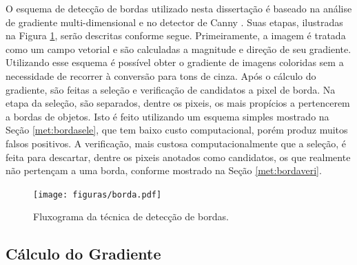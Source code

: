 O esquema de detecção de bordas utilizado nesta dissertação é baseado na análise de gradiente multi-dimensional \cite{borda00} e no detector de Canny \cite{canny}. Suas etapas, ilustradas na Figura \ref{figborda}, serão descritas conforme segue. Primeiramente, a imagem é tratada como um campo vetorial e são calculadas a magnitude e direção de seu gradiente. Utilizando esse esquema é possível obter o gradiente de imagens coloridas sem a necessidade de recorrer à conversão para tons de cinza. 
Após o cálculo do gradiente, são feitas a seleção e verificação de candidatos a pixel de borda. Na etapa da seleção, são separados, dentre os pixeis, os mais propícios a pertencerem a bordas de objetos. Isto é feito utilizando um esquema simples mostrado na Seção \ref{met:bordasele}, que tem baixo custo computacional, porém produz muitos falsos positivos. A verificação, mais custosa computacionalmente que a seleção, é feita para descartar, dentre os pixeis anotados como candidatos, os que realmente não pertençam a uma borda, conforme mostrado na Seção \ref{met:bordaveri}.


\begin{figure} [h]
\centering
\texttt{[image: figuras/borda.pdf]}
\caption{Fluxograma da técnica de detecção de bordas.} \label{figborda}
\end{figure}





\subsection{Cálculo do Gradiente} \label{met:bordagrad}


